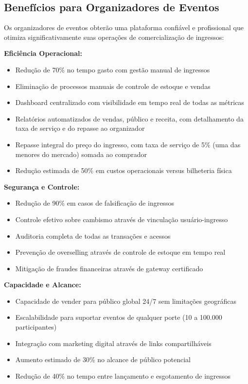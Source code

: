 \subsection{Benefícios para Organizadores de Eventos}

Os organizadores de eventos obterão uma plataforma confiável e profissional que otimiza significativamente suas operações de comercialização de ingressos:

\textbf{Eficiência Operacional:}
\begin{itemize}
    \item Redução de 70\% no tempo gasto com gestão manual de ingressos
    \item Eliminação de processos manuais de controle de estoque e vendas
    \item Dashboard centralizado com visibilidade em tempo real de todas as métricas
    \item Relatórios automatizados de vendas, público e receita, com detalhamento da taxa de serviço e do repasse ao organizador
    \item Repasse integral do preço do ingresso, com taxa de serviço de 5\% (uma das menores do mercado) somada ao comprador
    \item Redução estimada de 50\% em custos operacionais versus bilheteria física
\end{itemize}

\textbf{Segurança e Controle:}
\begin{itemize}
    \item Redução de 90\% em casos de falsificação de ingressos
    \item Controle efetivo sobre cambismo através de vinculação usuário-ingresso
    \item Auditoria completa de todas as transações e acessos
    \item Prevenção de overselling através de controle de estoque em tempo real
    \item Mitigação de fraudes financeiras através de gateway certificado
\end{itemize}

\textbf{Capacidade e Alcance:}
\begin{itemize}
    \item Capacidade de vender para público global 24/7 sem limitações geográficas
    \item Escalabilidade para suportar eventos de qualquer porte (10 a 100.000 participantes)
    \item Integração com marketing digital através de links compartilháveis
    \item Aumento estimado de 30\% no alcance de público potencial
    \item Redução de 40\% no tempo entre lançamento e esgotamento de ingressos
\end{itemize}

